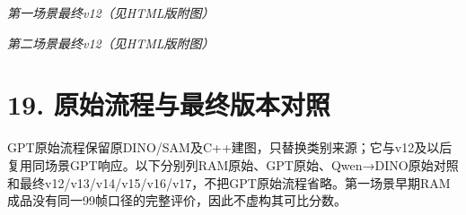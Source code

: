 \documentclass[UTF8,fontset=fandol]{ctexart}
\begin{document}
\textit{第一场景最终v12（见HTML版附图）}



\textit{第二场景最终v12（见HTML版附图）}



\section*{19. 原始流程与最终版本对照}

GPT原始流程保留原DINO/SAM及C++建图，只替换类别来源；它与v12及以后复用同场景GPT响应。以下分别列RAM原始、GPT原始、Qwen→DINO原始对照和最终v12/v13/v14/v15/v16/v17，不把GPT原始流程省略。第一场景早期RAM成品没有同一99帧口径的完整评价，因此不虚构其可比分数。
\end{document}
